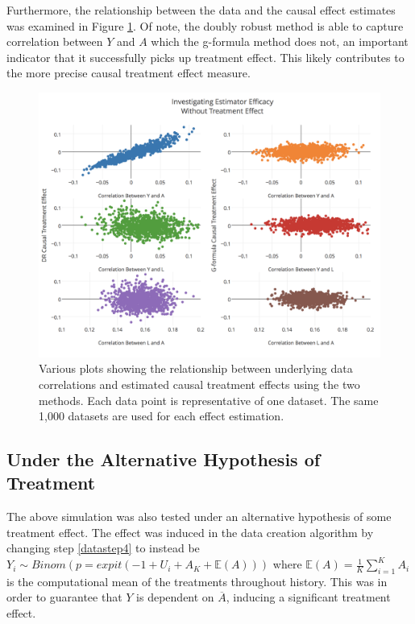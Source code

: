 Furthermore, the relationship between the data and the causal effect estimates was examined in Figure \ref{correlation}.  Of note, the doubly robust method is able to capture correlation between $Y$ and $A$ which the g-formula method does not, an important indicator that it successfully picks up treatment effect.  This likely contributes to the more precise causal treatment effect measure.  



\begin{figure}[h!]
\includegraphics[width = \linewidth]{figures/correlation.png}
\caption{Various plots showing the relationship between underlying data correlations and estimated causal treatment effects using the two methods.  Each data point is representative of one dataset.  The same 1,000 datasets are used for each effect estimation.}
\label{correlation}
\end{figure}

\subsection{Under the Alternative Hypothesis of Treatment} \label{alternative}
The above simulation was also tested under an alternative hypothesis of some treatment effect.  The effect was induced in the data creation algorithm by changing step \ref{datastep4} to instead be $Y_i \sim Binom(p = expit(-1+U_i + A_K + \mathbb{E}(A)))$ where $\mathbb{E}(A) = \frac{1}{K} \sum_{i=1}^K A_i $ is the computational mean of the treatments throughout history.  This was in order to guarantee that $Y$ is dependent on $\overline{A}$, inducing a significant treatment effect.  

